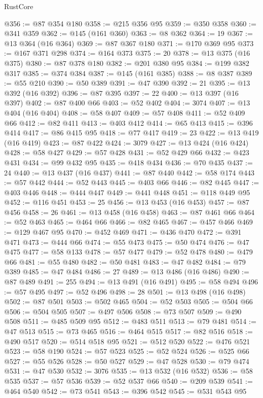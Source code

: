 \begin{lexlean}{RustCore}
\begin{coremodule}
@356 := @87 @354 @180
@358 := @215 @356 @95
@359 := @350 @358
@360 := @341 @359
@362 := @145 (@161 @360)
@363 := @8 @362
@364 := 19
@367 := @13 @364 (@16 @364)
@369 := @87 @367 @180
@371 := @170 @369 @95
@373 := @167 @371 @298
@374 := @164 @373
@375 := 20
@378 := @13 @375 (@16 @375)
@380 := @87 @378 @180
@382 := @201 @380 @95
@384 := @199 @382 @317
@385 := @374 @384
@387 := @145 (@161 @385)
@388 := @8 @387
@389 := @55 @210
@390 := @50 @389
@391 := @47 @390
@392 := 21
@395 := @13 @392 (@16 @392)
@396 := @87 @395
@397 := 22
@400 := @13 @397 (@16 @397)
@402 := @87 @400 @66
@403 := @52 @402
@404 := 3074
@407 := @13 @404 (@16 @404)
@408 := @58 @407
@409 := @57 @408
@411 := @52 @409 @66
@412 := @82 @411
@413 := @403 @412
@414 := @65 @413
@415 := @396 @414
@417 := @86 @415 @95
@418 := @77 @417
@419 := 23
@422 := @13 @419 (@16 @419)
@423 := @87 @422
@424 := 3079
@427 := @13 @424 (@16 @424)
@428 := @58 @427
@429 := @57 @428
@431 := @52 @429 @66
@432 := @423 @431
@434 := @99 @432 @95
@435 := @418 @434
@436 := @70 @435
@437 := 24
@440 := @13 @437 (@16 @437)
@441 := @87 @440
@442 := @58 @174
@443 := @57 @442
@444 := @52 @443
@445 := @403 @66
@446 := @82 @445
@447 := @403 @446
@448 := @444 @447
@449 := @441 @448
@451 := @118 @449 @95
@452 := @116 @451
@453 := 25
@456 := @13 @453 (@16 @453)
@457 := @87 @456
@458 := 26
@461 := @13 @458 (@16 @458)
@463 := @87 @461 @66
@464 := @52 @463
@465 := @464 @66
@466 := @82 @465
@467 := @457 @466
@469 := @129 @467 @95
@470 := @452 @469
@471 := @436 @470
@472 := @391 @471
@473 := @444 @66
@474 := @55 @473
@475 := @50 @474
@476 := @47 @475
@477 := @58 @133
@478 := @57 @477
@479 := @52 @478
@480 := @479 @66
@481 := @55 @480
@482 := @50 @481
@483 := @47 @482
@484 := @79 @389
@485 := @47 @484
@486 := 27
@489 := @13 @486 (@16 @486)
@490 := @87 @489
@491 := 255
@494 := @13 @491 (@16 @491)
@495 := @58 @494
@496 := @57 @495
@497 := @52 @496
@498 := 28
@501 := @13 @498 (@16 @498)
@502 := @87 @501
@503 := @502 @465
@504 := @52 @503
@505 := @504 @66
@506 := @504 @505
@507 := @497 @506
@508 := @73 @507
@509 := @490 @508
@511 := @485 @509 @95
@512 := @483 @511
@513 := @79 @481
@514 := @47 @513
@515 := @73 @465
@516 := @464 @515
@517 := @82 @516
@518 := @490 @517
@520 := @514 @518 @95
@521 := @512 @520
@522 := @476 @521
@523 := @58 @190
@524 := @57 @523
@525 := @52 @524
@526 := @525 @66
@527 := @55 @526
@528 := @50 @527
@529 := @47 @528
@530 := @79 @474
@531 := @47 @530
@532 := 3076
@535 := @13 @532 (@16 @532)
@536 := @58 @535
@537 := @57 @536
@539 := @52 @537 @66
@540 := @209 @539
@541 := @464 @540
@542 := @73 @541
@543 := @396 @542
@545 := @531 @543 @95

\end{coremodule}
\end{lexlean}

